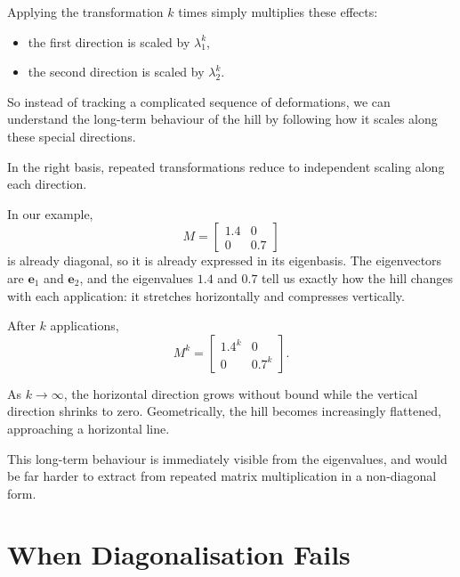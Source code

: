 \documentclass[11pt,openany]{book}
\theoremstyle{definition}
\begin{document}
\medskip

Applying the transformation $k$ times simply multiplies these effects:

\begin{itemize}
  \item the first direction is scaled by $\lambda_1^k$,
  \item the second direction is scaled by $\lambda_2^k$.
\end{itemize}

\medskip

So instead of tracking a complicated sequence of deformations, we can understand
the long-term behaviour of the hill by following how it scales along these special directions.

\medskip

\begin{keyidea} In the right basis, repeated transformations reduce to independent scaling along each direction.
\end{keyidea}
\medskip

In our example,
\[
M = \begin{bmatrix} 1.4 & 0 \\ 0 & 0.7 \end{bmatrix}
\]
is already diagonal, so it is already expressed in its eigenbasis. The eigenvectors
are $\mathbf{e}_1$ and $\mathbf{e}_2$, and the eigenvalues $1.4$ and $0.7$ tell us
exactly how the hill changes with each application: it stretches horizontally and
compresses vertically.

\medskip

After $k$ applications,
\[
M^k = \begin{bmatrix} 1.4^k & 0 \\ 0 & 0.7^k \end{bmatrix}.
\]

\medskip

As $k \to \infty$, the horizontal direction grows without bound while the vertical
direction shrinks to zero. Geometrically, the hill becomes increasingly flattened,
approaching a horizontal line.

\medskip

This long-term behaviour is immediately visible from the eigenvalues, and would be
far harder to extract from repeated matrix multiplication in a non-diagonal form.

\section{When Diagonalisation Fails}
\end{document}

